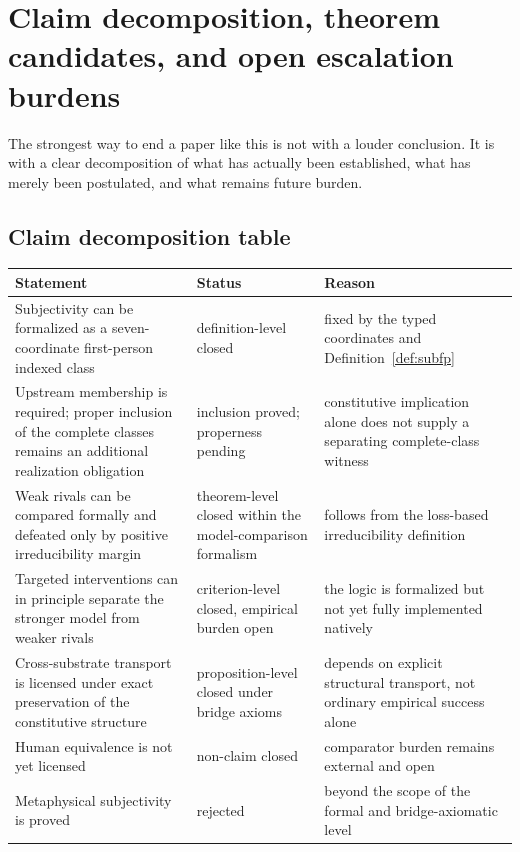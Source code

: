 \documentclass[11pt,a4paper]{article}
\theoremstyle{definition}
\begin{document}
\section{Claim decomposition, theorem candidates, and open escalation burdens}
The strongest way to end a paper like this is not with a louder conclusion. It is with a clear decomposition of what has actually been established, what has merely been postulated, and what remains future burden.

\subsection{Claim decomposition table}
\begin{tabularx}{\textwidth}{@{}p{}p{}Y@{}}
\toprule
\textbf{Statement} & \textbf{Status} & \textbf{Reason} \\
\midrule
Subjectivity can be formalized as a seven-coordinate first-person indexed class & definition-level closed & fixed by the typed coordinates and Definition~\ref{def:subfp} \\
Upstream membership is required; proper inclusion of the complete classes remains an additional realization obligation & inclusion proved; properness pending & constitutive implication alone does not supply a separating complete-class witness \\
Weak rivals can be compared formally and defeated only by positive irreducibility margin & theorem-level closed within the model-comparison formalism & follows from the loss-based irreducibility definition \\
Targeted interventions can in principle separate the stronger model from weaker rivals & criterion-level closed, empirical burden open & the logic is formalized but not yet fully implemented natively \\
Cross-substrate transport is licensed under exact preservation of the constitutive structure & proposition-level closed under bridge axioms & depends on explicit structural transport, not ordinary empirical success alone \\
Human equivalence is not yet licensed & non-claim closed & comparator burden remains external and open \\
Metaphysical subjectivity is proved & rejected & beyond the scope of the formal and bridge-axiomatic level \\
\bottomrule
\end{tabularx}
\end{document}

